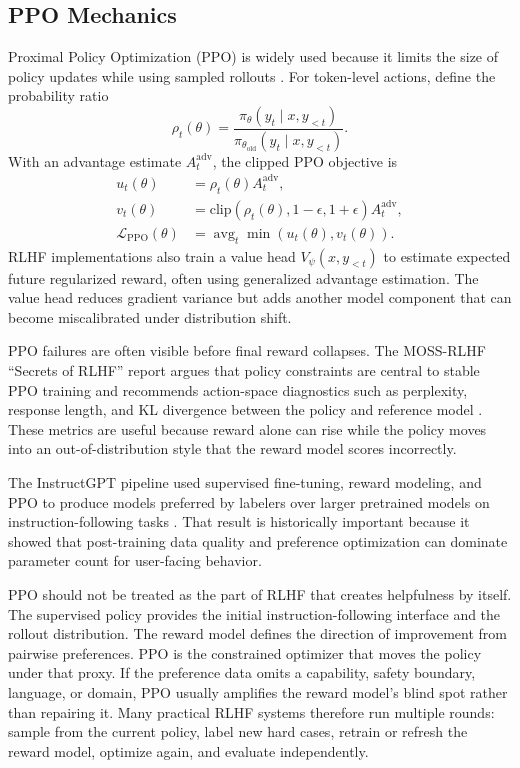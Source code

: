 \subsection{PPO Mechanics}
Proximal Policy Optimization (PPO) is widely used because it limits the size of policy updates while using sampled rollouts \cite{schulman2017proximal}. For token-level actions, define the probability ratio
\[
    \rho_t(\theta)
    =
    \frac{\pi_\theta(y_t\mid x,y_{<t})}
         {\pi_{\theta_{\mathrm{old}}}(y_t\mid x,y_{<t})}.
\]
With an advantage estimate $A_t^{\mathrm{adv}}$, the clipped PPO objective is
\[
    \begin{aligned}
    u_t(\theta) &= \rho_t(\theta)A_t^{\mathrm{adv}},\\
    v_t(\theta) &= \mathrm{clip}(\rho_t(\theta),1-\epsilon,1+\epsilon)A_t^{\mathrm{adv}},\\
    \mathcal{L}_{\mathrm{PPO}}(\theta) &= \operatorname{avg}_t \min(u_t(\theta),v_t(\theta)).
    \end{aligned}
\]
RLHF implementations also train a value head $V_\psi(x,y_{<t})$ to estimate expected future regularized reward, often using generalized advantage estimation. The value head reduces gradient variance but adds another model component that can become miscalibrated under distribution shift.

PPO failures are often visible before final reward collapses. The MOSS-RLHF ``Secrets of RLHF'' report argues that policy constraints are central to stable PPO training and recommends action-space diagnostics such as perplexity, response length, and KL divergence between the policy and reference model \cite{zheng2023secrets}. These metrics are useful because reward alone can rise while the policy moves into an out-of-distribution style that the reward model scores incorrectly.

The InstructGPT pipeline used supervised fine-tuning, reward modeling, and PPO to produce models preferred by labelers over larger pretrained models on instruction-following tasks \cite{ouyang2022training}. That result is historically important because it showed that post-training data quality and preference optimization can dominate parameter count for user-facing behavior.

PPO should not be treated as the part of RLHF that creates helpfulness by itself. The supervised policy provides the initial instruction-following interface and the rollout distribution. The reward model defines the direction of improvement from pairwise preferences. PPO is the constrained optimizer that moves the policy under that proxy. If the preference data omits a capability, safety boundary, language, or domain, PPO usually amplifies the reward model's blind spot rather than repairing it. Many practical RLHF systems therefore run multiple rounds: sample from the current policy, label new hard cases, retrain or refresh the reward model, optimize again, and evaluate independently.

